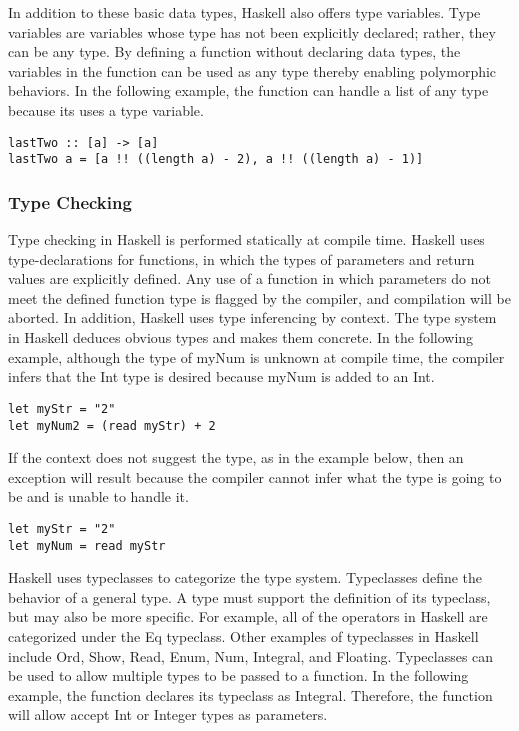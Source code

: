 \documentclass[titlepage,12pt]{article}
\begin{document}
In addition to these basic data types, Haskell also offers type variables. Type variables are variables whose type has 
not been explicitly declared; rather, they can be any type.  By defining a function without declaring data types, the 
variables in the function can be used as any type thereby enabling polymorphic behaviors. In the following example, the 
function can handle a list of any type because its uses a type variable. 

\begin{verbatim}
lastTwo :: [a] -> [a]
lastTwo a = [a !! ((length a) - 2), a !! ((length a) - 1)]
\end{verbatim}

\subsubsection{Type Checking}
Type checking in Haskell is performed statically at compile time. Haskell uses type-declarations for functions, in 
which the types of parameters and return values are explicitly defined. Any use of a function in which parameters 
do not meet the defined function type is flagged by the compiler, and compilation will be aborted. In addition, 
Haskell uses type inferencing by context. The type system in Haskell deduces obvious types and makes them concrete. In the 
following example, although the type of myNum is unknown at compile time, the compiler infers that the Int type 
is desired because myNum is added to an Int. 

\begin{verbatim}
let myStr = "2" 
let myNum2 = (read myStr) + 2
\end{verbatim}

If the context does not suggest the type, as in the example below, then an exception will result because the 
compiler cannot infer what the type is going to be and is unable to handle it. 

\begin{verbatim}
let myStr = "2" 
let myNum = read myStr
\end{verbatim}

Haskell uses typeclasses to categorize the type system. Typeclasses define the behavior of a general type. 
A type must support the definition of its typeclass, but may also be more specific. For example, all of the 
operators in Haskell are categorized under the Eq typeclass. Other examples of typeclasses in Haskell include Ord, 
Show, Read, Enum, Num, Integral, and Floating. Typeclasses can be used to allow multiple types to be passed to a 
function. In the following example, the function declares its typeclass as Integral. Therefore, the function will 
allow accept Int or Integer types as parameters. 
\end{document}
